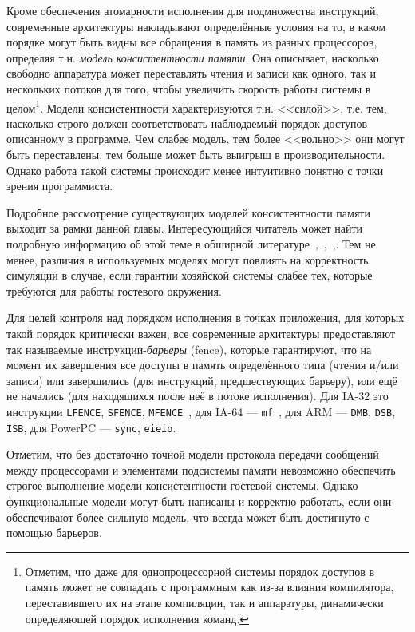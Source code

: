 Кроме обеспечения атомарности исполнения для подмножества инструкций, современные архитектуры накладывают определённые условия на то, в каком порядке могут быть видны все обращения в память из разных процессоров, определяя т.н. \textit{модель консистентности памяти}. Она описывает, насколько свободно аппаратура может переставлять чтения и записи как одного, так и нескольких потоков для того, чтобы увеличить скорость работы системы в целом\footnote{Отметим, что даже для однопроцессорной системы порядок доступов в память может не совпадать с программным как из-за влияния компилятора, переставившего их на этапе компиляции, так и аппаратуры, динамически определяющей порядок исполнения команд.}. Модели консистентности характеризуются т.н. <<силой>>, т.е. тем, насколько строго должен соответствовать наблюдаемый порядок доступов описанному в программе. Чем слабее модель, тем более <<вольно>> они могут быть переставлены, тем больше может быть выигрыш в производительности. Однако работа такой системы происходит менее интуитивно понятно с точки зрения программиста.

Подробное рассмотрение существующих моделей консистентности памяти выходит за рамки данной главы. Интересующийся читатель может найти подробную информацию об этой теме в обширной литературе~\cite{Adve96sharedmemory},~\cite{Mosberger93memoryconsistency},~\cite[глава 9 и приложение A.7]{DBLP:books/daglib/0013597},\cite{whymb}. Тем не менее, различия в используемых моделях могут повлиять на корректность симуляции в случае, если гарантии хозяйской системы слабее тех, которые требуются для работы гостевого окружения. 

Для целей контроля над порядком исполнения в точках приложения, для которых такой порядок критически важен, все современные архитектуры предоставляют так называемые инструкции-\textit{барьеры} (\abbr fence), которые гарантируют, что на момент их завершения все доступы в память определённого типа (чтения и/или записи) или завершились (для инструкций, предшествующих барьеру), или ещё не начались (для находящихся после неё в потоке исполнения). Для IA-32 это инструкции \texttt{LFENCE}, \texttt{SFENCE}, \texttt{MFENCE}~\cite{intel-64-memory-ordering}, для IA-64 --- \texttt{mf}~\cite{itanium-mem-order}, для ARM --- \texttt{DMB}, \texttt{DSB}, \texttt{ISB}, для PowerPC --- \texttt{sync}, \texttt{eieio}.

Отметим, что без достаточно точной модели протокола передачи сообщений между процессорами и элементами подсистемы памяти невозможно обеспечить строгое выполнение модели консистентности гостевой системы. Однако функциональные модели могут быть написаны и корректно работать, если они обеспечивают более сильную модель, что всегда может быть достигнуто с помощью барьеров.

